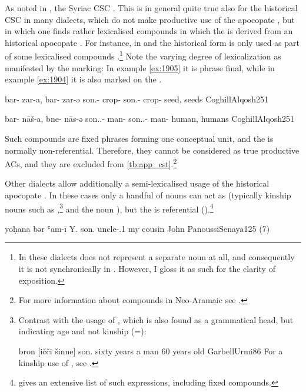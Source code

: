 As noted in , the Syriac CSC . This is in general quite true also for the historical CSC in many  dialects,  which  do not make productive use of the apocopate \cst*, but in which one finds rather  lexicalised compounds in which the \prim is  derived from an historical apocopate \cst*. For instance, in  \Qar and \Alq the historical \cst* form  is only used as part of some lexicalised compounds \parencites[211]{KhanQaraqosh}[251]{CoghillAlqosh}.\footnote{In these dialects  does not represent a separate noun at all, and consequently it is not synchronically in \cst*. However, I gloss it as such for the clarity of exposition.} Note the varying degree of lexicalization as manifested by the \pl* marking: In example \ref{ex:1905}  it is  phrase final, while in example \ref{ex:1904} it is also marked on the \prim.

{bar- zar-a, bar- zar-ə}
{son.\cst- crop-\sg{} son.\cst- crop-\pl}
{seed, seeds}
{CoghillAlqosh}{251}

{bar- nāš-a, bne- nās-ə}
{son.\sg.\cst- man-\sg{} son.\pl.\cst- man-\pl{}}
{human, humans}
{CoghillAlqosh}{251}



Such compounds are fixed phrases forming one conceptual unit, and the \secn is normally non-referential. Therefore, they cannot be considered as true productive ACs, and they are excluded from \ref{tb:app_cst}.\footnote{For more information about compounds in Neo-Aramaic see \citet{GutmanCompounds}.}

Other dialects allow additionally a semi-lexicalised usage of the historical apocopate \cst*. In these cases only a handful of nouns can act as \prims (typically kinship nouns  such as ,\footnote{Contrast with the usage of , which is also found as a grammatical head, but indicating age and not kinship (=):

{bron [ičči šinne]}
{son.\cst{} sixty years}
{a man 60 years old}
{GarbellUrmi}{86} 
For a kinship use of , see .
} and the \cst* noun ), but the \secn is referential ().\footnote{\citet[27--34, \S 16.(ii)]{MacleanGrammar} gives an extensive list of such expressions, including fixed compounds.}

\largerpage
{}
{yoḥana bər ʿam-ī}
{Y. son.\cst{} uncle-\poss.1\sg}
{my cousin John}
{PanoussiSenaya}{125 (7)}\antipar

